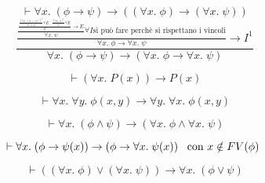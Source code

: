\documentclass{article}
\theoremstyle{break}
\theoremstyle{break}
\theoremstyle{break}
\theoremstyle{break}
\begin{document}
  \begin{figure}[H]
    \begin{exercise}
      \[
        \vdash \forall x.\; (\phi \to \psi) \to ((\forall x.\; \phi) \to (\forall x.\; \psi))
      \] 
      \label{D1}
      \[
        \frac{\frac{\frac{\frac{\frac{[\forall x.\; (\phi \to \psi)]^3}{\phi \to \psi} \forall E \;\;\;\frac{[\forall x.\;\phi]^1}{\phi} \forall E}{\psi} \to E}{\forall x.\;\psi}\forall I \text{si può fare perchè si rispettano i vincoli}}{\forall x.\;\phi \to \forall x.\; \psi} \to I^1}{\forall x.\;(\phi \to \psi) \to (\forall x.\;  \phi \to  \forall x.\; \psi)}
      \] 
    \end{exercise}

    \end{figure}
        \begin{figure}[H]
          \begin{exercise}[A casa]
        \[
          \vdash(\forall x.\; P(x)) \to P(x)
        \] 
      \end{exercise}
    \end{figure}
    \begin{figure}[H]
      \begin{exercise}[A casa]
        \[
          \vdash \forall x.\; \forall y.\; \phi(x,y) \to \forall y.\; \forall x.\; \phi(x,y)
        \] 
      \end{exercise}
    \end{figure}

    \begin{figure}[H]
      \begin{exercise}
        \[
        \vdash \forall x.\; (\phi \wedge \psi) \to (\forall x.\; \phi \wedge \forall x.\; \psi)
        \] 
      \end{exercise}
    \end{figure}
        \begin{figure}[H]
      \begin{exercise}
        \[
          \vdash \forall x.\; (\phi \to \psi(x)) \to (\phi \to \forall x.\; \psi(x)) \;\;\; \text{con \( x \notin FV(\phi) \) }
        \] 
      \end{exercise}
    \end{figure}

        \begin{figure}[H]
      \begin{exercise}
        \[
          \vdash ((\forall x.\;\phi) \vee (\forall x.\;\psi)) \to \forall x.\; (\phi \vee \psi)
        \] 
      \end{exercise}
    \end{figure}
\end{document}
